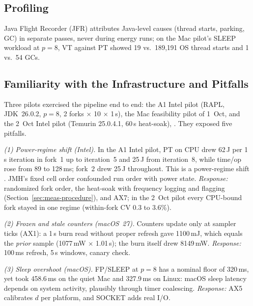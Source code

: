 \subsection{Profiling}\label{sec:meas-profiling}
Java Flight Recorder (JFR) attributes Java-level causes (thread starts, parking, GC) in separate passes, never during energy runs; on the Mac pilot's SLEEP workload at $p=8$, VT against PT showed 19 vs.\ 189,191 OS thread starts and 1 vs.\ 54 GCs. 

\subsection{Familiarity with the Infrastructure and Pitfalls}\label{sec:meas-pitfalls}
Three pilots exercised the pipeline end to end: the A1 Intel pilot (RAPL, JDK~26.0.2, $p=8$, 2 forks $\times$ 10 $\times$ 1\,s), the Mac feasibility pilot of 1~Oct, and the 2~Oct Intel pilot (Temurin 25.0.4.1, 60\,s heat-soak), . They exposed five pitfalls.

\emph{(1) Power-regime shift (Intel).} In the A1 Intel pilot, PT on CPU drew 62\,J per 1\,s iteration in fork~1 up to iteration~5 and 25\,J from iteration~8, while time/op rose from 89 to 128\,ms; fork~2 drew 25\,J throughout. This is a power-regime shift . JMH's fixed cell order confounded run order with power state. \emph{Response:} randomized fork order, the heat-soak with frequency logging and flagging (Section~\ref{sec:meas-procedure}), and AX7; in the 2~Oct pilot every CPU-bound fork stayed in one regime (within-fork CV 0.3 to 3.6\%).

\emph{(2) Frozen and stale counters (macOS~27).} Counters update only at sampler ticks (AX1): a 1\,s burn read without proper refresh gave 1100\,mJ, which equals the \emph{prior} sample (1077\,mW $\times$ 1.01\,s); the burn itself drew 8149\,mW. \emph{Response:} 100\,ms refresh, 5\,s windows, canary check.

\emph{(3) Sleep overshoot (macOS).} FP/SLEEP at $p=8$ has a nominal floor of 320\,ms, yet took 458.6\,ms on the quiet Mac and 327.9\,ms on Linux: macOS sleep latency depends on system activity, plausibly through timer coalescing. \emph{Response:} AX5 calibrates $d$ per platform, and SOCKET adds real I/O.

